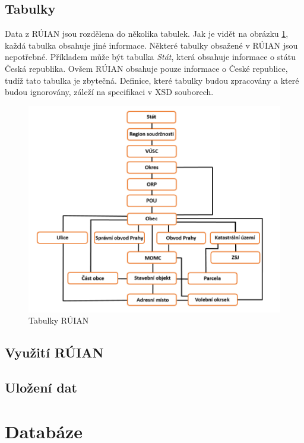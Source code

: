 \documentclass[czech, kiv, ba, he, iso690alph, pdf]{fasthesis}
\begin{document}
\section{Tabulky}
Data z RÚIAN jsou rozdělena do několika tabulek.
Jak je vidět na obrázku \ref{fig:ruian_tables}, každá tabulka obsahuje jiné informace.
Některé tabulky obsažené v RÚIAN jsou nepotřebné. 
Příkladem může být tabulka \textit{Stát}, která obsahuje informace o státu Česká republika.
Ovšem RÚIAN obsahuje pouze informace o České republice, tudíž tato tabulka je zbytečná.
Definice, které tabulky budou zpracovány a které budou ignorovány, záleží na specifikaci v XSD souborech. 

\pagebreak
\begin{figure}[H]
    \centering
    \includegraphics[width=\textwidth]{figures/ruian_tables.png}
    \caption{Tabulky RÚIAN}
    \label{fig:ruian_tables}
\end{figure}


\section{Využití RÚIAN}

\section{Uložení dat}


\chapter{Databáze}
\end{document}
